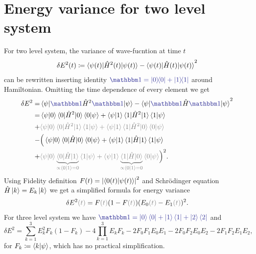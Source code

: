 \section{Energy variance for two level system}
For two level system, the variance of wave-fucntion at time $t$
\begin{equation}
    \delta E^2(t)\coloneqq \braket{\psi(t)|\hat{H}^2(t)|\psi(t)}-\braket{\psi(t)|\hat{H}(t)|\psi(t)}^2
\end{equation}
can be rewritten inserting identity $\bluee{\Id=\ket{0}\!\!\bra{0}+\ket{1}\!\!\bra{1}}$ around Hamiltonian. Omitting the time dependence of every element we get
\begin{equation}
    \begin{split}
        \delta E^2 =& \braket{\psi|\bluee{\Id}\HH^2\bluee{\Id}|\psi}-\braket{\psi|\bluee{\Id}\HH\bluee{\Id}|\psi}^2\\
        =&\braket{\psi|0}\braket{0|\HH^2|0}\braket{0|\psi}+\braket{\psi|1}\braket{1|\HH^2|1}\braket{1|\psi}\\
        +&\textcolor{gray}{\braket{\psi|0}\braket{0|\HH^2|1}\braket{1|\psi}+\braket{\psi|1}\braket{1|\HH^2|0}\braket{0|\psi}}\\
        -&\Big(\braket{\psi|0}\braket{0|\HH|0}\braket{0|\psi}+\braket{\psi|1}\braket{1|\HH|1}\braket{1|\psi}\\
        +&\textcolor{gray}{\braket{\psi|0}\underbrace{\braket{0|\HH|1}}_{\propto \braket{0|1}=0}\braket{1|\psi}+\braket{\psi|1}\underbrace{\braket{1|\HH|0}}_{\propto \braket{0|1}=0}\braket{0|\psi}}\Big)^2.
    \end{split}
\end{equation}
Using Fidelity definition $F(t)=\left|\braket{0(t)|\psi(t)}\right|^2$ and Schr\"odinger equation $\hat{H}\ket{k}=E_k\ket{k}$ we get a simplified formula for energy variance
\begin{equation}
    \delta E^2\gray{(t)} = F\gray{(t)}(1-F\gray{(t)})(E_0\gray{(t)}-E_1\gray{(t)})^2.
\end{equation}
For three level system we have $\bluee{\Id=\ket{0}\bra{0}+\ket{1}\bra{1}+\ket{2}\bra{2}}$ and
\begin{equation}
    \delta E^2=\sum_{k=1}^3 E_k^2 F_k(1-F_k)-4\prod_{k=1}^3 E_kF_k-2F_0F_1E_0E_1-2F_0F_2E_0E_2-2F_1F_2E_1E_2,
\end{equation}
for $F_k\coloneqq \braket{k|\psi}$, which has no practical simplification.











